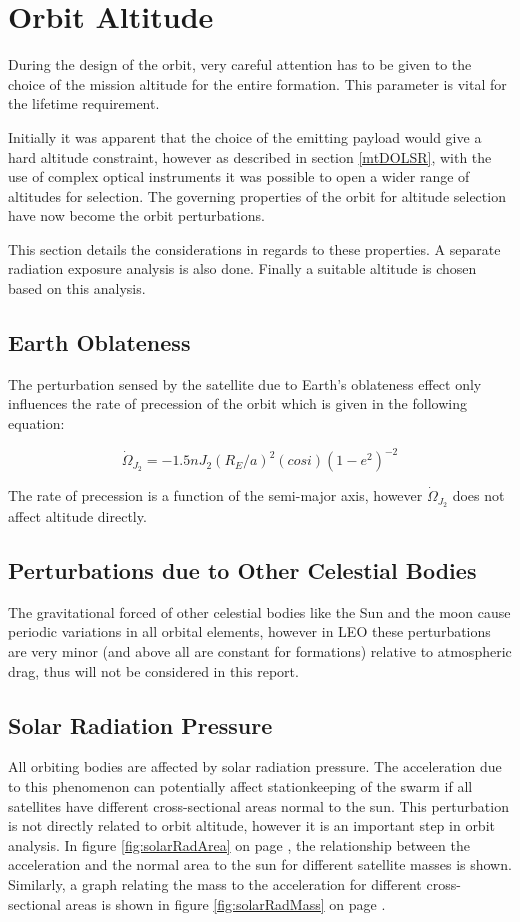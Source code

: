 \section{Orbit Altitude}
\label{mtrOrbAltitude}
During the design of the orbit, very careful attention has to be given to the choice of the mission altitude for the entire formation. This parameter is vital for the lifetime requirement.

Initially it was apparent that the choice of the emitting payload would give a hard altitude constraint, however as described in section \ref{mtDOLSR}, with the use of complex optical instruments it was possible to open a wider range of altitudes for selection. The governing properties of the orbit for altitude selection have now become the orbit perturbations.

This section details the considerations in regards to these properties. A separate radiation exposure analysis is also done. Finally a suitable altitude is chosen based on this analysis.
\subsection{Earth Oblateness}
\label{mtrOrbJ2}
The perturbation sensed by the satellite due to Earth's oblateness effect only influences the rate of precession of the orbit which is given in the following equation:

\begin{equation}
\dot{\Omega} _{J_2} = -1.5nJ_2 ( R_E / a )^2 ( cos i ) ( 1-e^2 )^{-2}
\label{j2eq}
\end{equation}

The rate of precession is a function of the semi-major axis, however $\dot{\Omega}_{J_2}$ does not affect altitude directly.

\subsection{Perturbations due to Other Celestial Bodies}
\label{mtrOrbSelestialBodies}
The gravitational forced of other celestial bodies like the Sun and the moon  cause periodic variations in all orbital elements, however in \ac{LEO} these perturbations are very minor (and above all are constant for formations) relative to atmospheric drag, thus will not be considered in this report.
\subsection{Solar Radiation Pressure}
\label{mtrOrbSolRadiation}
All orbiting bodies are affected by solar radiation pressure. The acceleration due to this phenomenon can potentially affect stationkeeping of the swarm if all satellites have different cross-sectional areas normal to the sun. This perturbation is not directly related to orbit altitude, however it is an important step in orbit analysis. In figure \ref{fig:solarRadArea} on page \pageref{fig:solarRadArea}, the relationship between the acceleration and the normal area to the sun for different satellite masses is shown. Similarly, a graph relating the mass to the acceleration for different cross-sectional areas is shown in figure \ref{fig:solarRadMass} on page \pageref{fig:solarRadMass}.

